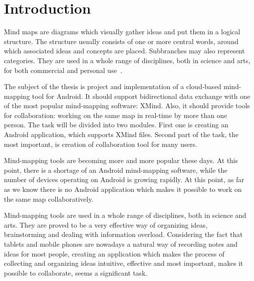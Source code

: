 %
%
%
%
%

\chapter{Introduction}
\label{chap:introduction}


Mind maps are diagrams which visually gather ideas and put them in a logical structure. The structure usually consists of one or more central words, around which associated ideas and concepts are placed. Subbranches may also represent categories. They are used in a whole range of disciplines, both in science and arts, for both commercial and personal use~\cite{Gee:2010:Roots}.


The subject of the thesis is project and implementation of a cloud-based mind-mapping tool for Android. It should support bidirectional data exchange with one of the most popular mind-mapping software: XMind. Also, it should provide tools for collaboration: working on the same map in real-time by more than one person. The task will be divided into two modules. First one is creating an Android application, which supports XMind files. Second part of the task, the most important, is creation of collaboration tool for many users. 


Mind-mapping tools are becoming more and more popular these days. At this point, there is a shortage of an Android mind-mapping software, while the number of devices operating on Android is growing rapidly. At this point, as far as we know there is no Android application which makes it possible to work on the same map collaboratively.


Mind-mapping tools are used in a whole range of disciplines, both in science and arts. They are proved to be a very effective way of organizing ideas, brainstorming and dealing with information overload. Considering the fact that tablets and mobile phones are nowadays a natural way of recording notes and ideas for most people, creating an application which makes the process of collecting and organizing ideas intuitive, effective and most important, makes it possible to collaborate, seems a significant task.

